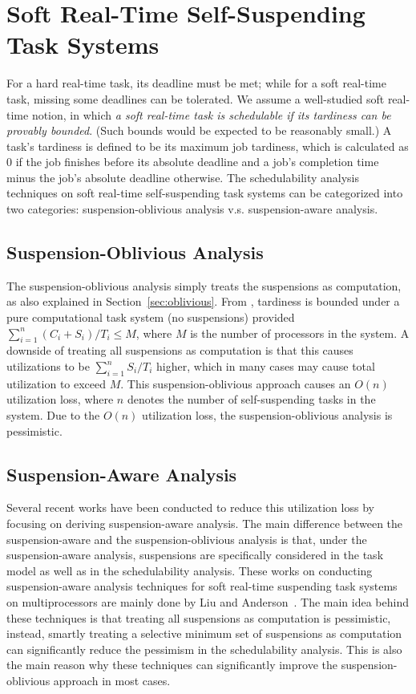 \section{Soft Real-Time Self-Suspending Task Systems}
\label{sec:soft-realtime}

For a hard real-time task, its deadline must be met; while for a soft real-time task, missing some deadlines can be tolerated. We assume a well-studied soft real-time notion, in which \emph{a soft real-time task is schedulable if its tardiness can be provably bounded}. (Such bounds would be expected to be reasonably small.) A task's tardiness is defined to be its maximum job tardiness, which is calculated as $0$ if the job finishes before its absolute deadline and a job's completion time minus the job's absolute deadline otherwise.
The schedulability analysis techniques on soft real-time self-suspending task systems can be categorized into two categories: suspension-oblivious analysis v.s. suspension-aware analysis.

\subsection{Suspension-Oblivious Analysis}
\label{sec:sus-oblivious-soft}

 The suspension-oblivious analysis simply treats the suspensions as computation, as also explained in Section~\ref{sec:oblivious}. From \cite{Devi2005,Leontyev072}, tardiness is bounded under a pure computational task system (no suspensions) provided $\sum_{i=1}^{n} (C_i+S_i)/T_i \leq M$, where $M$ is the number of processors in the system. A downside of treating all suspensions as computation is that this causes utilizations to be $\sum_{i=1}^{n} S_i/T_i$ higher, which in many cases may cause total utilization to exceed $M$.  This suspension-oblivious approach causes an $O(n)$ utilization loss, where $n$ denotes the number of self-suspending tasks in the system. 
 Due to the $O(n)$ utilization loss, the suspension-oblivious analysis is pessimistic. 

\subsection{Suspension-Aware Analysis}
\label{sec:sus-aware-soft}

Several recent works have been conducted to reduce this utilization loss by focusing on deriving suspension-aware analysis. The main difference between the suspension-aware and the suspension-oblivious analysis is that, under the suspension-aware analysis, suspensions are specifically considered in the task model as well as in the schedulability analysis. These works on conducting suspension-aware analysis techniques for soft real-time suspending task systems on multiprocessors are mainly done by Liu and Anderson~\cite{Liu3,Liu4,Liu5,Liu9,Liu11}. The main idea behind these techniques is that treating all suspensions as computation is pessimistic, instead, smartly treating a selective minimum set of suspensions as computation can significantly reduce the pessimism in the schedulability analysis. This is also the main reason why these techniques can significantly improve the suspension-oblivious approach in most cases.

